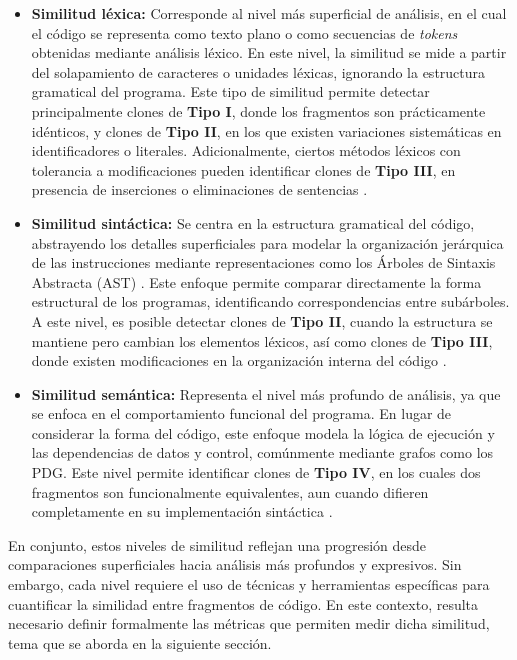 \begin{itemize}

\item \textbf{Similitud léxica:} Corresponde al nivel más superficial de análisis, en el cual el código se representa como texto plano o como secuencias de \textit{tokens} obtenidas mediante análisis léxico. En este nivel, la similitud se mide a partir del solapamiento de caracteres o unidades léxicas, ignorando la estructura gramatical del programa\cite{Lu2026CSSG}. Este tipo de similitud permite detectar principalmente clones de \textbf{Tipo I}, donde los fragmentos son prácticamente idénticos, y clones de \textbf{Tipo II}, en los que existen variaciones sistemáticas en identificadores o literales. Adicionalmente, ciertos métodos léxicos con tolerancia a modificaciones pueden identificar clones de \textbf{Tipo III}, en presencia de inserciones o eliminaciones de sentencias \cite{Roy2007Survey}.

\item \textbf{Similitud sintáctica:} Se centra en la estructura gramatical del código, abstrayendo los detalles superficiales para modelar la organización jerárquica de las instrucciones mediante representaciones como los Árboles de Sintaxis Abstracta (AST) \cite{Lu2026CSSG}. Este enfoque permite comparar directamente la forma estructural de los programas, identificando correspondencias entre subárboles. A este nivel, es posible detectar clones de \textbf{Tipo II}, cuando la estructura se mantiene pero cambian los elementos léxicos, así como clones de \textbf{Tipo III}, donde existen modificaciones en la organización interna del código \cite{Roy2007Survey}.

\item \textbf{Similitud semántica:} Representa el nivel más profundo de análisis, ya que se enfoca en el comportamiento funcional del programa. En lugar de considerar la forma del código, este enfoque modela la lógica de ejecución y las dependencias de datos y control, comúnmente mediante grafos como los PDG. Este nivel permite identificar clones de \textbf{Tipo IV}, en los cuales dos fragmentos son funcionalmente equivalentes, aun cuando difieren completamente en su implementación sintáctica \cite{Lu2026CSSG}.

\end{itemize}

En conjunto, estos niveles de similitud reflejan una progresión desde comparaciones superficiales hacia análisis más profundos y expresivos. Sin embargo, cada nivel requiere el uso de técnicas y herramientas específicas para cuantificar la similidad entre fragmentos de código. En este contexto, resulta necesario definir formalmente las métricas que permiten medir dicha similitud, tema que se aborda en la siguiente sección.


